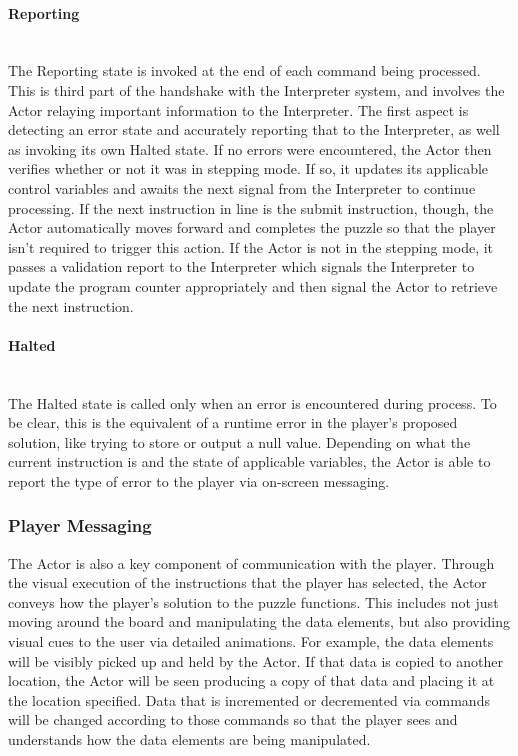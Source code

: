 \paragraph{Reporting}~\\
The Reporting state is invoked at the end of each command being processed. This is third part of the handshake with the Interpreter system, and involves the Actor relaying important information to the Interpreter. The first aspect is detecting an error state and accurately reporting that to the Interpreter, as well as invoking its own Halted state. If no errors were encountered, the Actor then verifies whether or not it was in stepping mode. If so, it updates its applicable control variables and awaits the next signal from the Interpreter to continue processing. If the next instruction in line is the submit instruction, though, the Actor automatically moves forward and completes the puzzle so that the player isn't required to trigger this action. If the Actor is not in the stepping mode, it passes a validation report to the Interpreter which signals the Interpreter to update the program counter appropriately and then signal the Actor to retrieve the next instruction.

\paragraph{Halted} ~\\
The Halted state is called only when an error is encountered during process. To be clear, this is the equivalent of a runtime error in the player's proposed solution, like trying to store or output a null value. Depending on what the current instruction is and the state of applicable variables, the Actor is able to report the type of error to the player via on-screen messaging.

\subsubsection{Player Messaging}
The Actor is also a key component of communication with the player. Through the visual execution of the instructions that the player has selected, the Actor conveys how the player's solution to the puzzle functions. This includes not just moving around the board and manipulating the data elements, but also providing visual cues to the user via detailed animations. For example, the data elements will be visibly picked up and held by the Actor. If that data is copied to another location, the Actor will be seen producing a copy of that data and placing it at the location specified. Data that is incremented or decremented via commands will be changed according to those commands so that the player sees and understands how the data elements are being manipulated.\\

